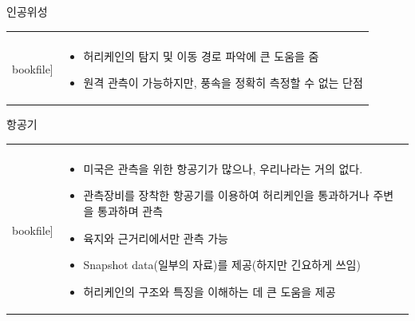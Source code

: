 \begin{frame}[t]{인공위성}
	\begin{tabular}{ll}
		\begin{minipage}[t]{0.6\textwidth}\scriptsize
			\begin{figure}[t]
				\texttt{[image: \\bookfile]}
			\end{figure}
		\end{minipage}	
		&
		\begin{minipage}[t]{0.35\textwidth} \scriptsize	
			\begin{itemize}
				\item 허리케인의 탐지 및 이동 경로 파악에 큰 도움을 줌
				\item 원격 관측이 가능하지만, 풍속을 정확히 측정할 수 없는 단점
			\end{itemize}
			
		\end{minipage}
	\end{tabular}
\end{frame}


\begin{frame}[t]{항공기}
	\begin{tabular}{ll}
		\begin{minipage}[t]{0.5\textwidth}\scriptsize
			\begin{figure}[t]
				\texttt{[image: \\bookfile]}
			\end{figure}
		\end{minipage}	
		&
		\begin{minipage}[t]{0.45\textwidth} \scriptsize	
			\begin{itemize}
				\item 미국은 관측을 위한 항공기가 많으나, 우리나라는 거의 없다.
				\item 관측장비를 장착한 항공기를 이용하여 허리케인을 통과하거나 주변을 통과하며 관측
				\item 육지와 근거리에서만 관측 가능
				\item Snapshot data(일부의 자료)를 제공(하지만 긴요하게 쓰임)
				\item 허리케인의 구조와 특징을 이해하는 데 큰 도움을 제공
			\end{itemize}

		\end{minipage}
	\end{tabular}
\end{frame}




